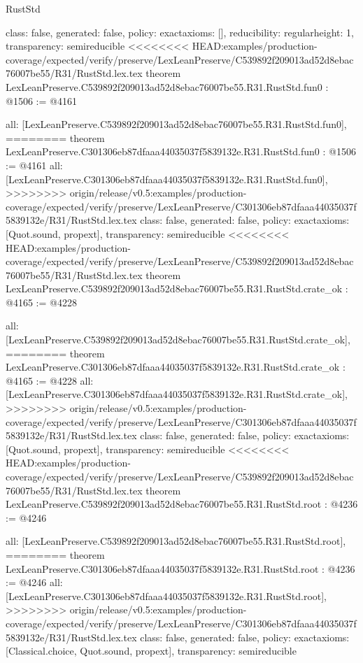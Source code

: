 \begin{lexlean}{RustStd}
\begin{coremodule}
{\begin{coremodule}
{{{  class: false,
  generated: false,
  policy: exact{axioms: []},
  reducibility: regular{height: 1},
  transparency: semireducible
}
<<<<<<<< HEAD:examples/production-coverage/expected/verify/preserve/LexLeanPreserve/C539892f209013ad52d8ebac76007be55/R31/RustStd.lex.tex
theorem LexLeanPreserve.C539892f209013ad52d8ebac76007be55.R31.RustStd.fun0 : @1506 := @4161 {
  all: [LexLeanPreserve.C539892f209013ad52d8ebac76007be55.R31.RustStd.fun0],
========
theorem LexLeanPreserve.C301306eb87dfaaa44035037f5839132e.R31.RustStd.fun0 : @1506 := @4161 {
  all: [LexLeanPreserve.C301306eb87dfaaa44035037f5839132e.R31.RustStd.fun0],
>>>>>>>> origin/release/v0.5:examples/production-coverage/expected/verify/preserve/LexLeanPreserve/C301306eb87dfaaa44035037f5839132e/R31/RustStd.lex.tex
  class: false,
  generated: false,
  policy: exact{axioms: [Quot.sound, propext]},
  transparency: semireducible
}
<<<<<<<< HEAD:examples/production-coverage/expected/verify/preserve/LexLeanPreserve/C539892f209013ad52d8ebac76007be55/R31/RustStd.lex.tex
theorem LexLeanPreserve.C539892f209013ad52d8ebac76007be55.R31.RustStd.crate_ok : @4165 := @4228 {
  all: [LexLeanPreserve.C539892f209013ad52d8ebac76007be55.R31.RustStd.crate_ok],
========
theorem LexLeanPreserve.C301306eb87dfaaa44035037f5839132e.R31.RustStd.crate_ok : @4165 := @4228 {
  all: [LexLeanPreserve.C301306eb87dfaaa44035037f5839132e.R31.RustStd.crate_ok],
>>>>>>>> origin/release/v0.5:examples/production-coverage/expected/verify/preserve/LexLeanPreserve/C301306eb87dfaaa44035037f5839132e/R31/RustStd.lex.tex
  class: false,
  generated: false,
  policy: exact{axioms: [Quot.sound, propext]},
  transparency: semireducible
}
<<<<<<<< HEAD:examples/production-coverage/expected/verify/preserve/LexLeanPreserve/C539892f209013ad52d8ebac76007be55/R31/RustStd.lex.tex
theorem LexLeanPreserve.C539892f209013ad52d8ebac76007be55.R31.RustStd.root : @4236 := @4246 {
  all: [LexLeanPreserve.C539892f209013ad52d8ebac76007be55.R31.RustStd.root],
========
theorem LexLeanPreserve.C301306eb87dfaaa44035037f5839132e.R31.RustStd.root : @4236 := @4246 {
  all: [LexLeanPreserve.C301306eb87dfaaa44035037f5839132e.R31.RustStd.root],
>>>>>>>> origin/release/v0.5:examples/production-coverage/expected/verify/preserve/LexLeanPreserve/C301306eb87dfaaa44035037f5839132e/R31/RustStd.lex.tex
  class: false,
  generated: false,
  policy: exact{axioms: [Classical.choice, Quot.sound, propext]},
  transparency: semireducible
}

}}}}}
\end{coremodule}}
\end{coremodule}
\end{lexlean}

